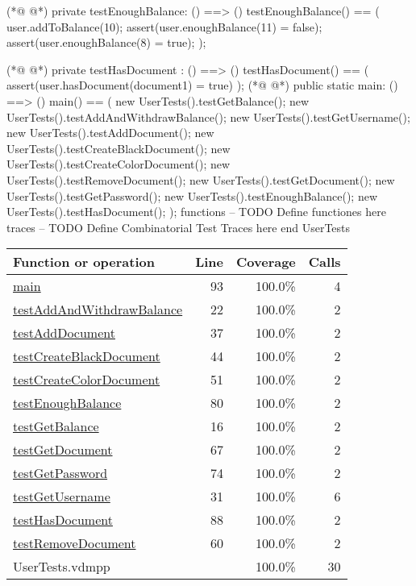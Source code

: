 \begin{vdmpp}[breaklines=true]
(*@
\label{testEnoughBalance:80}
@*)
private testEnoughBalance: () ==> ()
testEnoughBalance() ==
(
user.addToBalance(10);
assert(user.enoughBalance(11) = false);
assert(user.enoughBalance(8) = true); 
);

(*@
\label{testHasDocument:88}
@*)
private testHasDocument : () ==> ()
testHasDocument() ==
(
assert(user.hasDocument(document1) = true)
);
(*@
\label{main:93}
@*)
public static main: () ==> ()
 main() ==
 (
 new UserTests().testGetBalance();
 new UserTests().testAddAndWithdrawBalance();
 new UserTests().testGetUsername();
 new UserTests().testAddDocument();
 new UserTests().testCreateBlackDocument();
 new UserTests().testCreateColorDocument();
 new UserTests().testRemoveDocument();
 new UserTests().testGetDocument();
 new UserTests().testGetPassword();
 new UserTests().testEnoughBalance();
 new UserTests().testHasDocument();
 );
functions
-- TODO Define functiones here
traces
-- TODO Define Combinatorial Test Traces here
end UserTests
\end{vdmpp}
\bigskip
\begin{longtable}{|l|r|r|r|}
\hline
Function or operation & Line & Coverage & Calls \\
\hline
\hline
\hyperref[main:93]{main} & 93&100.0\% & 4 \\
\hline
\hyperref[testAddAndWithdrawBalance:22]{testAddAndWithdrawBalance} & 22&100.0\% & 2 \\
\hline
\hyperref[testAddDocument:37]{testAddDocument} & 37&100.0\% & 2 \\
\hline
\hyperref[testCreateBlackDocument:44]{testCreateBlackDocument} & 44&100.0\% & 2 \\
\hline
\hyperref[testCreateColorDocument:51]{testCreateColorDocument} & 51&100.0\% & 2 \\
\hline
\hyperref[testEnoughBalance:80]{testEnoughBalance} & 80&100.0\% & 2 \\
\hline
\hyperref[testGetBalance:16]{testGetBalance} & 16&100.0\% & 2 \\
\hline
\hyperref[testGetDocument:67]{testGetDocument} & 67&100.0\% & 2 \\
\hline
\hyperref[testGetPassword:74]{testGetPassword} & 74&100.0\% & 2 \\
\hline
\hyperref[testGetUsername:31]{testGetUsername} & 31&100.0\% & 6 \\
\hline
\hyperref[testHasDocument:88]{testHasDocument} & 88&100.0\% & 2 \\
\hline
\hyperref[testRemoveDocument:60]{testRemoveDocument} & 60&100.0\% & 2 \\
\hline
\hline
UserTests.vdmpp & & 100.0\% & 30 \\
\hline
\end{longtable}

